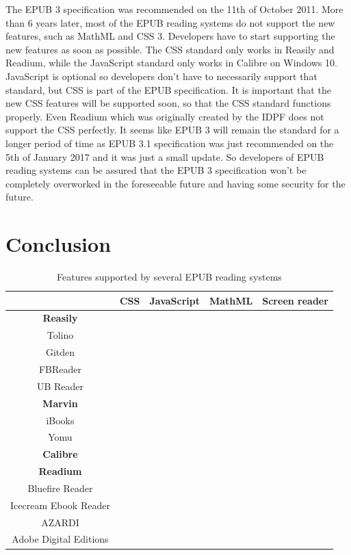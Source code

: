 The EPUB 3 specification \cite{EPUBspecs} was recommended on the 11th of October 2011. More than 6 years later, most of the EPUB reading systems do not support the new features, such as MathML and CSS 3. Developers have to start supporting the new features as soon as possible. The CSS standard only works in Reasily and Readium, while the JavaScript standard only works in Calibre on Windows 10. JavaScript is optional so developers don't have to necessarily support that standard, but CSS is part of the EPUB specification. It is important that the new CSS features will be supported soon, so that the CSS standard functions properly. Even Readium which was originally created by the IDPF does not support the CSS perfectly. It seems like EPUB 3 will remain the standard for a longer period of time as EPUB 3.1 specification was just recommended on the 5th of January 2017 and it was just a small update. So developers of EPUB reading systems can be assured that the EPUB 3 specification won't be completely overworked in the foreseeable future and having some security for the future. 

\section{Conclusion}
\begin{table}
	\centering
	\caption{Features supported by several EPUB reading systems}
	\begin{tabular}{| c | c | c | c | c |}
		\hline
		& CSS & JavaScript & MathML & Screen reader \\ \hline
		\textbf{Reasily} & \cmark & \xmark & \cmark & \cmark \\  \hline
		Tolino & \xmark & \xmark & \xmark & \xmark \\ \hline
		Gitden & \xmark & \xmark & \cmark & \cmark \\ \hline
		FBReader & \xmark & \xmark & \xmark & \xmark \\ \hline
		UB Reader & \xmark & \xmark & \xmark & \xmark \\ \hline
		
		\textbf{Marvin} & \xmark & \cmark & \cmark & \cmark \\ \hline
		iBooks & \xmark & \xmark & \cmark & \cmark \\ \hline
		Yomu & \xmark & \xmark & \cmark & \cmark \\ \hline
		
		\textbf{Calibre} & \xmark & \cmark & \cmark & \xmark \\ \hline
		\textbf{Readium} & \cmark & \xmark & \cmark & \cmark \\ \hline		
		Bluefire Reader & \xmark & \xmark & \xmark & \xmark \\ \hline
		Icecream Ebook Reader & \xmark & \xmark & \xmark & \xmark \\ \hline
		AZARDI & \xmark & \xmark & \cmark & \cmark \\ \hline		
		Adobe Digital Editions & \xmark & \xmark & \cmark & \cmark \\ \hline
		
	\end{tabular}
	\label{fig:table}
\end{table}

